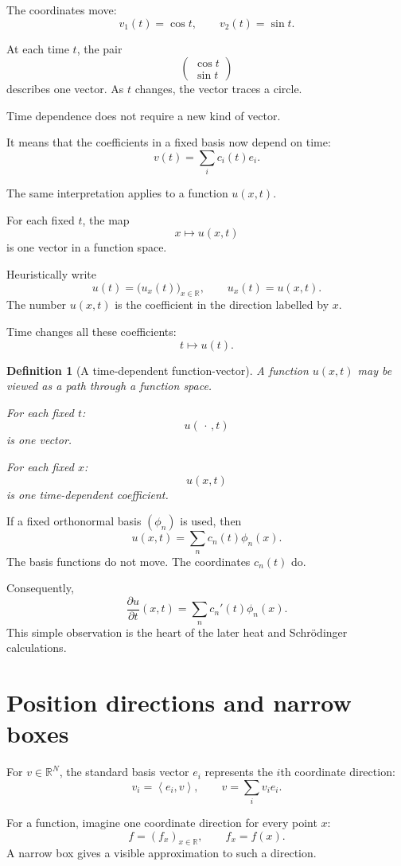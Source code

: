 \documentclass[11pt,a5paper,oneside,openany]{scrreprt}
\theoremstyle{notes}
\theoremstyle{definitions}
\newtheorem{definition}[theorem]{Definition}
\newcommand{\R}{\mathbb{R}}
\newcommand{\ip}[2]{\left\langle #1,#2\right\rangle}
\begin{document}
The coordinates move:
\[
 v_1(t)=\cos t,
 \qquad
 v_2(t)=\sin t.
\]

At each time $t$, the pair
\[
 \begin{pmatrix}\cos t\\ \sin t\end{pmatrix}
\]
describes one vector.  As $t$ changes, the vector traces a circle.

\begin{bridge}
Time dependence does not require a new kind of vector.

It means that the coefficients in a fixed basis now depend on time:
\[
 v(t)=\sum_i c_i(t)e_i.
\]
\end{bridge}

The same interpretation applies to a function $u(x,t)$.

For each fixed $t$, the map
\[
 x\longmapsto u(x,t)
\]
is one vector in a function space.

Heuristically write
\[
 u(t)=\bigl(u_x(t)\bigr)_{x\in\R},
 \qquad
 u_x(t)=u(x,t).
\]
The number $u(x,t)$ is the coefficient in the direction labelled by $x$.

Time changes all these coefficients:
\[
 t\longmapsto u(t).
\]

\begin{definition}[A time-dependent function-vector]
A function $u(x,t)$ may be viewed as a path through a function space.

For each fixed $t$:
\[
 u(\,\cdot\,,t)
\]
is one vector.

For each fixed $x$:
\[
 u(x,t)
\]
is one time-dependent coefficient.
\end{definition}

If a fixed orthonormal basis $(\phi_n)$ is used, then
\[
 u(x,t)=\sum_n c_n(t)\phi_n(x).
\]
The basis functions do not move.  The coordinates $c_n(t)$ do.

Consequently,
\[
 \frac{\partial u}{\partial t}(x,t)
 =\sum_n c_n'(t)\phi_n(x).
\]
This simple observation is the heart of the later heat and
Schr\"odinger calculations.

\section{Position directions and narrow boxes}

For $v\in\R^N$, the standard basis vector $e_i$ represents the $i$th
coordinate direction:
\[
 v_i=\ip{e_i}{v},
 \qquad
 v=\sum_i v_i e_i.
\]

For a function, imagine one coordinate direction for every point $x$:
\[
 f=(f_x)_{x\in\R},
 \qquad
 f_x=f(x).
\]
A narrow box gives a visible approximation to such a direction.
\end{document}
